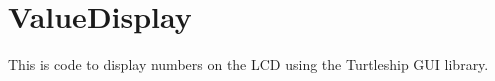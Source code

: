 \chapter{Value\+Display}
\hypertarget{md_README}{}\label{md_README}
\label{md_README_autotoc_md8}%
%
This is code to display numbers on the LCD using the Turtleship GUI library. 